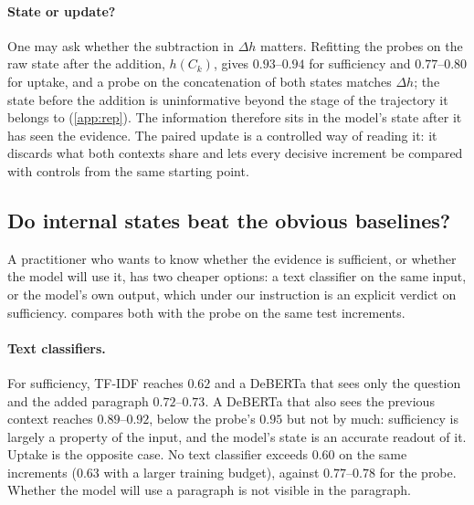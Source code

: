\paragraph{State or update?}
One may ask whether the subtraction in $\Delta h$ matters. Refitting the probes on the raw state after the addition, $h(C_k)$, gives $0.93$--$0.94$ for sufficiency and $0.77$--$0.80$ for uptake, and a probe on the concatenation of both states matches $\Delta h$; the state before the addition is uninformative beyond the stage of the trajectory it belongs to (\cref{app:rep}). The information therefore sits in the model's state after it has seen the evidence. The paired update is a controlled way of reading it: it discards what both contexts share and lets every decisive increment be compared with controls from the same starting point.

\subsection{Do internal states beat the obvious baselines?}
\label{sec:text}
A practitioner who wants to know whether the evidence is sufficient, or whether the model will use it, has two cheaper options: a text classifier on the same input, or the model's own output, which under our instruction is an explicit verdict on sufficiency.  compares both with the probe on the same test increments.

\begin{table}[t]
\centering\small
\setlength{\tabcolsep}{2.5pt}

\caption{Baselines on the same test increments as the probe (document split, AUROC). Text classifiers see the question and the added paragraph (``q+added'') or also the previous context (``+context''). ``verbalised'': the model answers rather than saying INSUFFICIENT after the increment. ``confidence'': the better of top-token probability and negative entropy at the anchor. The matched task has text baselines for Qwen only.}
\label{tab:baselines}
\end{table}

\paragraph{Text classifiers.}
For sufficiency, TF-IDF reaches $0.62$ and a DeBERTa that sees only the question and the added paragraph $0.72$--$0.73$. A DeBERTa that also sees the previous context reaches $0.89$--$0.92$, below the probe's $0.95$ but not by much: sufficiency is largely a property of the input, and the model's state is an accurate readout of it. Uptake is the opposite case. No text classifier exceeds $0.60$ on the same increments ($0.63$ with a larger training budget), against $0.77$--$0.78$ for the probe. Whether the model will use a paragraph is not visible in the paragraph.

